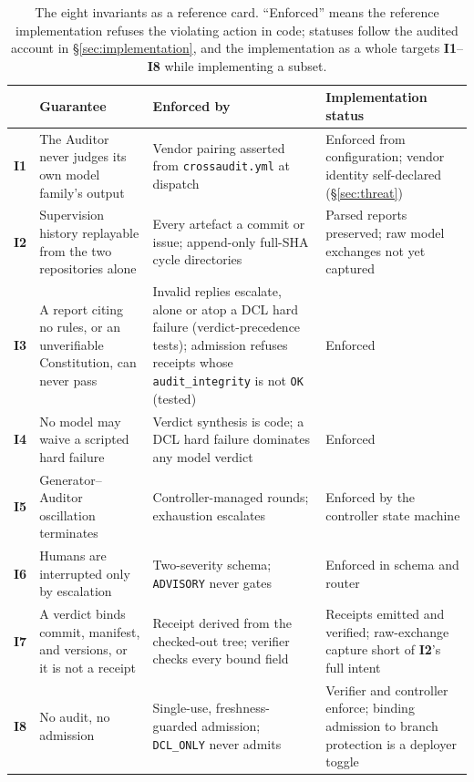\documentclass[11pt,letterpaper]{article}
\newcommand{\invariant}[1]{\textbf{I#1}}
\begin{document}
\begin{table}[t]
\centering
\footnotesize
\caption{The eight invariants as a reference card. ``Enforced'' means the reference implementation refuses the violating action in code; statuses follow the audited account in \S\ref{sec:implementation}, and the implementation as a whole targets \invariant{1}--\invariant{8} while implementing a subset.}
\label{tab:invariants}
\begin{tabular}{@{}l p{3.45cm} p{4.35cm} p{4.35cm}@{}}
\toprule
 & Guarantee & Enforced by & Implementation status \\
\midrule
\invariant{1} & The Auditor never judges its own model family's output & Vendor pairing asserted from \texttt{crossaudit.yml} at dispatch & Enforced from configuration; vendor identity self-declared (\S\ref{sec:threat}) \\
\invariant{2} & Supervision history replayable from the two repositories alone & Every artefact a commit or issue; append-only full-SHA cycle directories & Parsed reports preserved; raw model exchanges not yet captured \\
\invariant{3} & A report citing no rules, or an unverifiable Constitution, can never pass & Invalid replies escalate, alone or atop a DCL hard failure (verdict-precedence tests); admission refuses receipts whose \texttt{audit\_integrity} is not \texttt{OK} (tested) & Enforced \\
\invariant{4} & No model may waive a scripted hard failure & Verdict synthesis is code; a DCL hard failure dominates any model verdict & Enforced \\
\invariant{5} & Generator--Auditor oscillation terminates & Controller-managed rounds; exhaustion escalates & Enforced by the controller state machine \\
\invariant{6} & Humans are interrupted only by escalation & Two-severity schema; \texttt{ADVISORY} never gates & Enforced in schema and router \\
\invariant{7} & A verdict binds commit, manifest, and versions, or it is not a receipt & Receipt derived from the checked-out tree; verifier checks every bound field & Receipts emitted and verified; raw-exchange capture short of \invariant{2}'s full intent \\
\invariant{8} & No audit, no admission & Single-use, freshness-guarded admission; \texttt{DCL\_ONLY} never admits & Verifier and controller enforce; binding admission to branch protection is a deployer toggle \\
\bottomrule
\end{tabular}
\end{table}
\end{document}
